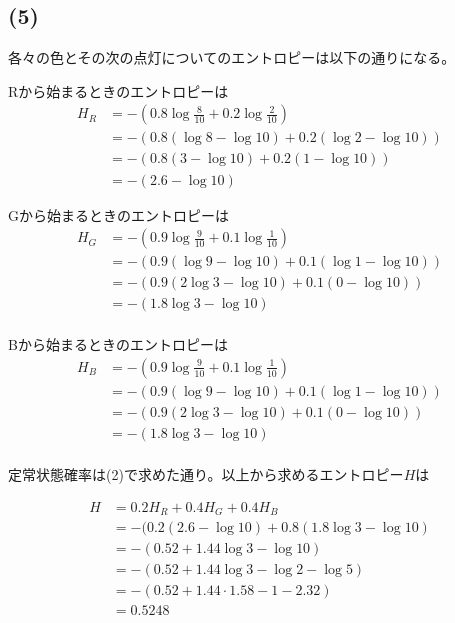 \documentclass[a4paper,12pt,xelatex,ja=standard]{bxjsarticle}
\begin{document}
\subsection*{(5)}
各々の色とその次の点灯についてのエントロピーは以下の通りになる。

Rから始まるときのエントロピーは
\begin{equation*}
  \begin{split}
    H_{R}
      &= -(0.8 \log{\frac{8}{10}} + 0.2 \log{\frac{2}{10}}) \\
      &= -(0.8 (\log 8 - \log10) + 0.2 (\log 2 - \log10)) \\
      &= -(0.8 (3 - \log10) + 0.2 (1 - \log10)) \\
      &= -(2.6 - \log10)
  \end{split}
\end{equation*}

Gから始まるときのエントロピーは
\begin{equation*}
  \begin{split}
    H_{G}
      &= -(0.9 \log{\frac{9}{10}} + 0.1 \log{\frac{1}{10}}) \\
      &= -(0.9 (\log 9 - \log 10) + 0.1 (\log 1 - \log 10)) \\
      &= -(0.9 (2 \log 3 - \log 10) + 0.1 (0 - \log 10)) \\
      &= -(1.8 \log 3 - \log 10) \\
  \end{split}
\end{equation*}

Bから始まるときのエントロピーは
\begin{equation*}
  \begin{split}
    H_{B}
      &= -(0.9 \log{\frac{9}{10}} + 0.1 \log{\frac{1}{10}}) \\
      &= -(0.9 (\log 9 - \log 10) + 0.1 (\log 1 - \log 10)) \\
      &= -(0.9 (2 \log 3 - \log 10) + 0.1 (0 - \log 10)) \\
      &= -(1.8 \log 3 - \log 10) \\
  \end{split}
\end{equation*}

定常状態確率は(2)で求めた通り。以上から求めるエントロピー$H$は

\begin{equation*}
  \begin{split}
    H &= 0.2 H_R + 0.4 H_G + 0.4 H_B \\
      &= -(0.2 (2.6 - \log 10) + 0.8 (1.8 \log 3 - \log 10) \\
      &= -(0.52 + 1.44 \log 3 - \log 10 ) \\
      &= -(0.52 + 1.44 \log 3 - \log 2 - \log 5 ) \\
      &= -(0.52 + 1.44 \cdot 1.58 - 1 - 2.32 ) \\
      &= 0.5248
  \end{split}
\end{equation*}
\end{document}
